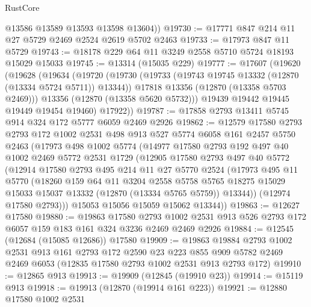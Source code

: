 \begin{lexlean}{RustCore}
\begin{coremodule}
        @13586
        @13589
        @13593
        @13598
        @13604))
@19730 := @17771 @847 @214 @11 @27 @5729 @2469 @2524 @2619 @5702 @2463
@19733 := @17973 @847 @11 @5729
@19743 := @18178 @229 @64 @11 @3249 @2558 @5710 @5724 @18193 @15029 @15033
@19745 := @13314 (@15035 @229)
@19777 := @17607
    (@19620
      (@19628
        (@19634
          (@19720
            (@19730
              (@19733 (@19743 @19745 @13332 (@12870 (@13334 @5724 @5711)) @13344))
              @17818
              @13356
              (@12870 (@13358 @5703 @2469)))
            @13356
            (@12870 (@13358 @5620 @5732)))
          @19439
          @19442
          @19445
          @19449
          @19454
          @19460)
        @17922))
@19787 := @17858 @2793 @13411 @5745 @914 @324 @172 @5777 @6059 @2469 @2926
@19862 := @12579
    @17580
    @2793
    @2793
    @172
    @1002
    @2531
    @498
    @913
    @527
    @5774
    @6058
    @161
    @2457
    @5750
    @2463
    (@17973
      @498
      @1002
      @5774
      (@14977
        @17580
        @2793
        @192
        @497
        @40
        @1002
        @2469
        @5772
        @2531
        @1729
        (@12905
          @17580
          @2793
          @497
          @40
          @5772
          (@12914
            @17580
            @2793
            @495
            @214
            @11
            @27
            @5770
            @2524
            (@17973
              @495
              @11
              @5770
              (@18260
                @159
                @64
                @11
                @3204
                @2558
                @5758
                @5765
                @18275
                @15029
                @15033
                @15037
                @13332
                (@12870 (@13334 @5765 @5759))
                @13344))
            (@12974 @17580 @2793)))
        @15053
        @15056
        @15059
        @15062
        @13344))
@19863 := @12627 @17580
@19880 := @19863
    @17580
    @2793
    @1002
    @2531
    @913
    @526
    @2793
    @172
    @6057
    @159
    @183
    @161
    @324
    @3236
    @2469
    @2469
    @2926
@19884 := @12545 (@12684 (@15085 @12686)) @17580
@19909 := @19863
    @19884
    @2793
    @1002
    @2531
    @913
    @161
    @2793
    @172
    @2590
    @23
    @223
    @855
    @909
    @5782
    @2469
    @2469
    @6053
    (@12835 @17580 @2793 @1002 @2531 @913 @2793 @172)
@19910 := @12865 @913
@19913 := @19909 (@12845 (@19910 @23))
@19914 := @15119 @913
@19918 := @19913 (@12870 (@19914 @161 @223))
@19921 := @12880 @17580 @1002 @2531

\end{coremodule}
\end{lexlean}
